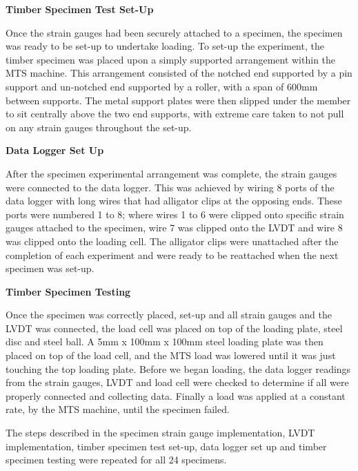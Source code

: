 \documentclass[11pt,a4paper]{article}
\numberwithin{equation}{subsection}
\begin{document}
\vspace*{\baselineskip}

\textbf{Timber Specimen Test Set-Up}\par
\noindent
Once the strain gauges had been securely attached to a specimen, the specimen was ready to be set-up to undertake loading. To set-up the experiment, the timber specimen was placed upon a simply supported arrangement within the MTS machine. This arrangement consisted of the notched end supported by a pin support and un-notched end supported by a roller, with a span of 600mm between supports. The metal support plates were then slipped under the member to sit centrally above the two end supports, with extreme care taken to not pull on any strain gauges throughout the set-up. 

\vspace*{\baselineskip}

\textbf{Data Logger Set Up}\par
\noindent
After the specimen experimental arrangement was complete, the strain gauges were connected to the data logger. This was achieved by wiring 8 ports of the data logger with long wires that had alligator clips at the opposing ends. These ports were numbered 1 to 8; where wires 1 to 6 were clipped onto specific strain gauges attached to the specimen, wire 7 was clipped onto the LVDT and wire 8 was clipped onto the loading cell. The alligator clips were unattached after the completion of each experiment and were ready to be reattached when the next specimen was set-up. 

\vspace*{\baselineskip}

\textbf{Timber Specimen Testing}\par
\noindent
Once the specimen was correctly placed, set-up and all strain gauges and the LVDT was connected, the load cell was placed on top of the loading plate, steel disc and steel ball. A 5mm x 100mm x 100mm steel loading plate was then placed on top of the load cell, and the MTS load was lowered until it was just touching the top loading plate. Before we began loading, the data logger readings from the strain gauges, LVDT and load cell were checked to determine if all were properly connected and collecting data. Finally a load was applied at a constant rate, by the MTS machine, until the specimen failed. 

\vspace*{\baselineskip}
\noindent
The steps described in the specimen strain gauge implementation, LVDT implementation, timber specimen test set-up, data logger set up and timber specimen testing were repeated for all 24 specimens. 
\end{document}
